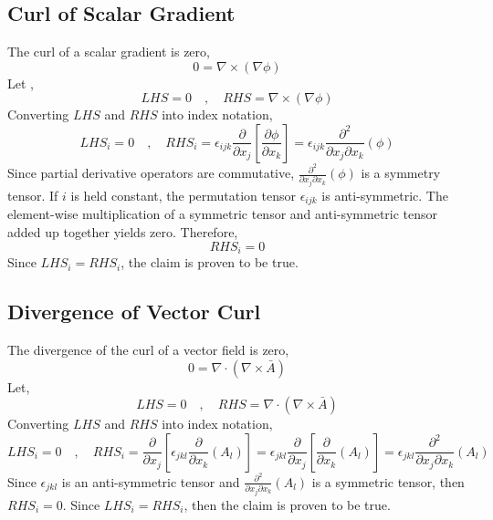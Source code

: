 \subsection{Curl of Scalar Gradient}
\begin{comment}
\end{comment}
The curl of a scalar gradient is zero,
$$0 = \nabla\times(\nabla\phi)$$
Let ,
$$LHS = 0 \quad,\quad RHS = \nabla\times(\nabla\phi)$$
Converting $LHS$ and $RHS$ into index notation,
$$LHS_i = 0 \quad,\quad RHS_i =  \epsilon_{ijk}\frac{\partial}{\partial x_j}\left[\frac{\partial \phi}{\partial x_k}\right] = \epsilon_{ijk}\frac{\partial^2 }{\partial x_j \partial x_k}(\phi)$$
Since partial derivative operators are commutative, $\displaystyle \frac{\partial^2 }{\partial x_j \partial x_k}(\phi)$ is a symmetry tensor. If $i$ is held constant, the permutation tensor $\epsilon_{ijk}$ is anti-symmetric. The element-wise multiplication of a symmetric tensor and anti-symmetric tensor added up together yields zero. Therefore,
$$RHS_i = 0$$
Since $LHS_i = RHS_i$, the claim is proven to be true.
\subsection{Divergence of Vector Curl}
\begin{comment}
\end{comment}
The divergence of the curl of a vector field is zero,
$$0 = \nabla\cdot(\nabla\times \bar{A})$$
Let,
$$LHS = 0 \quad,\quad RHS = \nabla\cdot(\nabla\times \bar{A})$$
Converting $LHS$ and $RHS$ into index notation,
$$LHS_i = 0 \quad,\quad RHS_i = \frac{\partial}{\partial x_j}\left[\epsilon_{jkl} \frac{\partial}{\partial x_k}(A_l)\right] = \epsilon_{jkl}\frac{\partial}{\partial x_j}\left[\frac{\partial}{\partial x_k}(A_l)\right] = \epsilon_{jkl}\frac{\partial^2}{\partial x_j\partial x_k}(A_l)$$
Since $\epsilon_{jkl}$ is an anti-symmetric tensor and $\displaystyle \frac{\partial^2}{\partial x_j\partial x_k}(A_l)$ is a symmetric tensor, then $RHS_i = 0$. Since $LHS_i = RHS_i$, then the claim is proven to be true.

